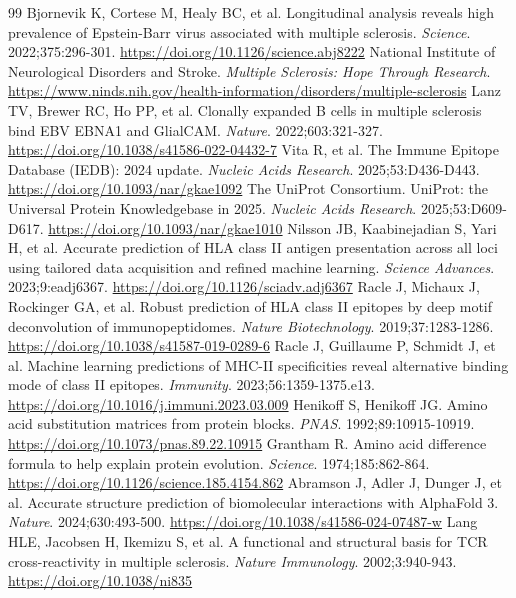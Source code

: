 \begin{thebibliography}{99}
 Bjornevik K, Cortese M, Healy BC, et al. Longitudinal analysis reveals high prevalence of Epstein-Barr virus associated with multiple sclerosis. \textit{Science}. 2022;375:296-301. \url{https://doi.org/10.1126/science.abj8222}
 National Institute of Neurological Disorders and Stroke. \textit{Multiple Sclerosis: Hope Through Research}. \url{https://www.ninds.nih.gov/health-information/disorders/multiple-sclerosis}
 Lanz TV, Brewer RC, Ho PP, et al. Clonally expanded B cells in multiple sclerosis bind EBV EBNA1 and GlialCAM. \textit{Nature}. 2022;603:321-327. \url{https://doi.org/10.1038/s41586-022-04432-7}
 Vita R, et al. The Immune Epitope Database (IEDB): 2024 update. \textit{Nucleic Acids Research}. 2025;53:D436-D443. \url{https://doi.org/10.1093/nar/gkae1092}
 The UniProt Consortium. UniProt: the Universal Protein Knowledgebase in 2025. \textit{Nucleic Acids Research}. 2025;53:D609-D617. \url{https://doi.org/10.1093/nar/gkae1010}
 Nilsson JB, Kaabinejadian S, Yari H, et al. Accurate prediction of HLA class II antigen presentation across all loci using tailored data acquisition and refined machine learning. \textit{Science Advances}. 2023;9:eadj6367. \url{https://doi.org/10.1126/sciadv.adj6367}
 Racle J, Michaux J, Rockinger GA, et al. Robust prediction of HLA class II epitopes by deep motif deconvolution of immunopeptidomes. \textit{Nature Biotechnology}. 2019;37:1283-1286. \url{https://doi.org/10.1038/s41587-019-0289-6}
 Racle J, Guillaume P, Schmidt J, et al. Machine learning predictions of MHC-II specificities reveal alternative binding mode of class II epitopes. \textit{Immunity}. 2023;56:1359-1375.e13. \url{https://doi.org/10.1016/j.immuni.2023.03.009}
 Henikoff S, Henikoff JG. Amino acid substitution matrices from protein blocks. \textit{PNAS}. 1992;89:10915-10919. \url{https://doi.org/10.1073/pnas.89.22.10915}
 Grantham R. Amino acid difference formula to help explain protein evolution. \textit{Science}. 1974;185:862-864. \url{https://doi.org/10.1126/science.185.4154.862}
 Abramson J, Adler J, Dunger J, et al. Accurate structure prediction of biomolecular interactions with AlphaFold 3. \textit{Nature}. 2024;630:493-500. \url{https://doi.org/10.1038/s41586-024-07487-w}
 Lang HLE, Jacobsen H, Ikemizu S, et al. A functional and structural basis for TCR cross-reactivity in multiple sclerosis. \textit{Nature Immunology}. 2002;3:940-943. \url{https://doi.org/10.1038/ni835}

\end{thebibliography}
